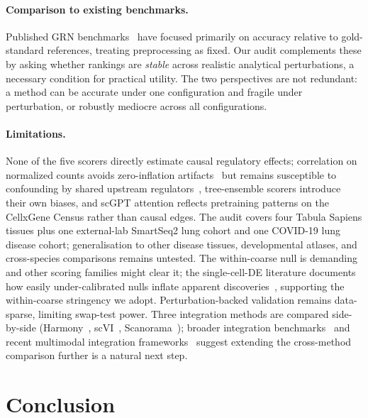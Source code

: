 \documentclass[unnumsec,webpdf,contemporary,large,namedate]{oup-authoring-template}
\begin{document}
\paragraph{Comparison to existing benchmarks.}
Published GRN benchmarks~\citep{Pratapa2020, Chen2018} have focused primarily on
accuracy relative to gold-standard references, treating preprocessing as fixed.
Our audit complements these by asking whether rankings are \emph{stable} across
realistic analytical perturbations, a necessary condition for practical utility.
The two perspectives are not redundant: a method can be accurate under one
configuration and fragile under perturbation, or robustly mediocre across all
configurations.

\paragraph{Limitations.}
None of the five scorers directly estimate causal regulatory effects;
correlation on normalized counts avoids zero-inflation
artifacts~\citep{Svensson2020} but remains susceptible to confounding
by shared upstream regulators~\citep{Kharchenko2014}, tree-ensemble
scorers introduce their own biases, and scGPT attention reflects
pretraining patterns on the CellxGene Census rather than causal edges.
The audit covers four Tabula Sapiens tissues plus one external-lab
SmartSeq2 lung cohort and one COVID-19 lung disease cohort;
generalisation to other disease tissues, developmental atlases, and
cross-species comparisons remains untested. The within-coarse null is
demanding and other scoring families might clear it; the
single-cell-DE literature documents how easily under-calibrated nulls
inflate apparent
discoveries~\citep{Squair2021}, supporting the within-coarse stringency
we adopt. Perturbation-backed validation remains data-sparse, limiting
swap-test power. Three integration methods are compared side-by-side
(Harmony~\citep{Korsunsky2019}, scVI~\citep{Gayoso2022},
Scanorama~\citep{Hie2019}); broader integration
benchmarks~\citep{Luecken2022, Tran2020} and recent multimodal
integration frameworks~\citep{Hao2024} suggest extending the
cross-method comparison further is a natural next step.

\section{Conclusion}
\end{document}
